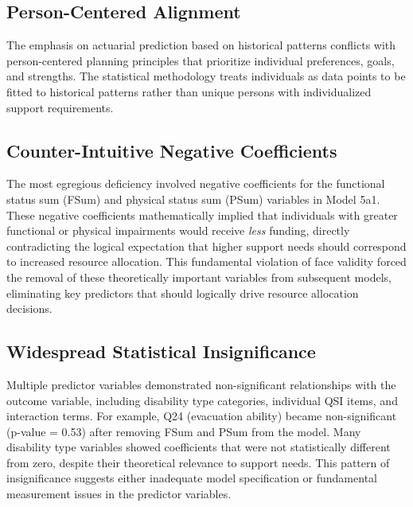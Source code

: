 \subsection{Person-Centered Alignment}
The emphasis on actuarial prediction based on historical patterns conflicts with person-centered planning principles that prioritize individual preferences, goals, and strengths. The statistical methodology treats individuals as data points to be fitted to historical patterns rather than unique persons with individualized support requirements.

\subsection{Counter-Intuitive Negative Coefficients}
The most egregious deficiency involved negative coefficients for the functional status sum (FSum) and physical status sum (PSum) variables in Model 5a1. These negative coefficients mathematically implied that individuals with greater functional or physical impairments would receive \textit{less} funding, directly contradicting the logical expectation that higher support needs should correspond to increased resource allocation. This fundamental violation of face validity forced the removal of these theoretically important variables from subsequent models, eliminating key predictors that should logically drive resource allocation decisions.

\subsection{Widespread Statistical Insignificance}
Multiple predictor variables demonstrated non-significant relationships with the outcome variable, including disability type categories, individual QSI items, and interaction terms. For example, Q24 (evacuation ability) became non-significant (p-value = 0.53) after removing FSum and PSum from the model. Many disability type variables showed coefficients that were not statistically different from zero, despite their theoretical relevance to support needs. This pattern of insignificance suggests either inadequate model specification or fundamental measurement issues in the predictor variables.

